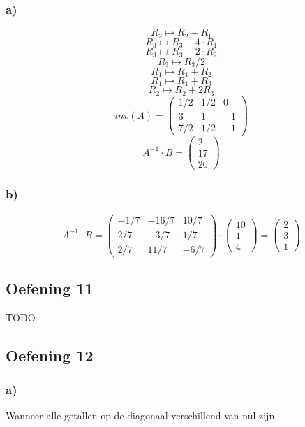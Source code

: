 \documentclass[lineaire_algebra_oplossingen.tex]{subfiles}
\begin{document}
\subsubsection*{a)}
\[R_2 \longmapsto R_2 - R_1 \]
\[R_3 \longmapsto R_3 -4\cdot R_1 \]
\[R_3 \longmapsto R_3 -2\cdot R_2 \]
\[R_3 \longmapsto R_3/2 \]
\[R_1 \longmapsto R_1 + R_2 \]
\[R_1 \longmapsto R_1 + R_3 \]
\[R_2 \longmapsto R_2 + 2R_3 \]
\[inv(A) = 
\begin{pmatrix}
1/2 & 1/2 & 0\\
3 & 1 & -1\\
7/2 & 1/2 & -1
\end{pmatrix}
\]
\[A^{-1} \cdot B = 
\begin{pmatrix}
2\\
17\\
20
\end{pmatrix}
\]
\subsubsection*{b)}
\[A^{-1} \cdot B = 
\begin{pmatrix}
-1/7 & -16/7 & 10/7\\
2/7 & -3/7 & 1/7\\
2/7 & 11/7 & -6/7
\end{pmatrix}
\cdot
\begin{pmatrix}
10\\
1\\
4
\end{pmatrix}
=
\begin{pmatrix}
2\\
3\\
1
\end{pmatrix}
\]

\subsection{Oefening 11}
TODO

\subsection{Oefening 12}
\subsubsection*{a)}
Wanneer alle getallen op de diagonaal verschillend van nul zijn.
\end{document}
